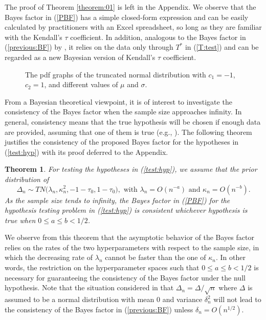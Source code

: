 \documentclass[11pt]{article}
\newtheorem{theorem0}{Theorem}
\begin{document}
The proof of Theorem \ref{theorem:01} is left in the Appendix. We observe that the Bayes factor in (\ref{PBF}) has a simple closed-form expression and can be easily calculated by practitioners with an Excel spreadsheet, so long as they are familiar with the Kendall's $\tau$ coefficient. In addition, analogous to the Bayes factor in (\ref{previous:BF}) by \cite{Yuan:John:2008}, it relies on the data only through $T^\ast$ in (\ref{T:test}) and can be regarded as a new Bayesian version of Kendall's $\tau$ coefficient.
{\begin{figure}[!htbp]
\centering {}
\caption{The pdf graphs of the truncated normal distribution with $c_1 = -1$, $c_2 = 1$, and different values of $\mu$ and $\sigma$.} \label{FIG:equal}
\end{figure}
}

From a Bayesian theoretical viewpoint, it is of interest to investigate the consistency of the Bayes factor when the sample size approaches infinity. In general, consistency means that the true hypothesis will be chosen if enough data are provided, assuming that one of them is true (e.g., \citeauthor{Fern:2001} \citeyear{Fern:2001}). The following theorem justifies the consistency of the proposed Bayes factor for the hypotheses in (\ref{test:hyp}) with its proof deferred to the Appendix.

\begin{theorem0} \label{theorem:02}
For testing the hypotheses in  (\ref{test:hyp}), we assume that the prior distribution of
$$
\Delta_n \sim TN\bigl(\lambda_n, \kappa_n^2, -1 - \tau_0, 1 - \tau_0\bigr), \text{ with }\lambda_n = O(n^{-a})\text{ and } \kappa_n = O(n^{-b}).
$$
As the sample size tends to infinity, the Bayes factor in (\ref{PBF}) for the hypothesis testing problem in  (\ref{test:hyp}) is consistent whichever hypothesis is true when $0\le a\le b<{1}/{2}$.
\end{theorem0}
We observe from this theorem that the asymptotic behavior of the Bayes factor relies on the rates of the two hyperparameters with respect to the sample size, in which the decreasing rate of $\lambda_n$ cannot be faster than the one of $\kappa_n$. In other words, the restriction on the hyperparameter spaces such that $0 \leq a \leq b < 1/2$ is necessary for guaranteeing the consistency of the Bayes factor under the null hypothesis. Note that the situation considered in \cite{Yuan:John:2008} that $\Delta_n = {\Delta}/{\sqrt{n}}$ where $\Delta$ is assumed to be a normal distribution with mean 0 and variance $\delta_n^2$ will not lead to the consistency of the Bayes factor in (\ref{previous:BF}) unless $\delta_n = O(n^{1/2})$.
\end{document}
